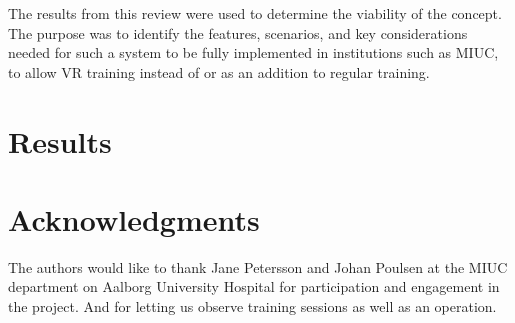 \documentclass[conference]{IEEEtran}
\begin{document}

The results from this review were used to determine the viability of the concept. The purpose was to identify the features, scenarios, and key considerations needed for such a system to be fully implemented in institutions such as MIUC, to allow VR training instead of or as an addition to regular training.


\section{Results}
%
%



%
%






\section*{Acknowledgments}
The authors would like to thank Jane Petersson and Johan Poulsen at the MIUC department on Aalborg University Hospital for participation and engagement in the project. And for letting us observe training sessions as well as an operation.
\end{document}
